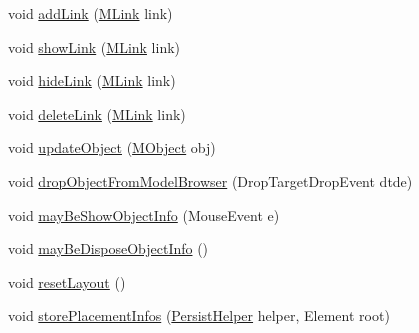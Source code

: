 \begin{DoxyCompactItemize}
\item 
void \hyperlink{classorg_1_1tzi_1_1use_1_1gui_1_1views_1_1diagrams_1_1objectdiagram_1_1_new_object_diagram_a4a1f7aac4cf125048456fac22bf7065e}{add\-Link} (\hyperlink{interfaceorg_1_1tzi_1_1use_1_1uml_1_1sys_1_1_m_link}{M\-Link} link)
\item 
void \hyperlink{classorg_1_1tzi_1_1use_1_1gui_1_1views_1_1diagrams_1_1objectdiagram_1_1_new_object_diagram_a06616425eae95e7cd7ff78eef36d0422}{show\-Link} (\hyperlink{interfaceorg_1_1tzi_1_1use_1_1uml_1_1sys_1_1_m_link}{M\-Link} link)
\item 
void \hyperlink{classorg_1_1tzi_1_1use_1_1gui_1_1views_1_1diagrams_1_1objectdiagram_1_1_new_object_diagram_a0f75792e0afb3957c0cb706755bfd6ff}{hide\-Link} (\hyperlink{interfaceorg_1_1tzi_1_1use_1_1uml_1_1sys_1_1_m_link}{M\-Link} link)
\item 
void \hyperlink{classorg_1_1tzi_1_1use_1_1gui_1_1views_1_1diagrams_1_1objectdiagram_1_1_new_object_diagram_a4e9d42caf1974571a03b594bfdfbd00b}{delete\-Link} (\hyperlink{interfaceorg_1_1tzi_1_1use_1_1uml_1_1sys_1_1_m_link}{M\-Link} link)
\item 
void \hyperlink{classorg_1_1tzi_1_1use_1_1gui_1_1views_1_1diagrams_1_1objectdiagram_1_1_new_object_diagram_ae520c718a17255740cabbe82fd36bcf5}{update\-Object} (\hyperlink{interfaceorg_1_1tzi_1_1use_1_1uml_1_1sys_1_1_m_object}{M\-Object} obj)
\item 
void \hyperlink{classorg_1_1tzi_1_1use_1_1gui_1_1views_1_1diagrams_1_1objectdiagram_1_1_new_object_diagram_a98e0de1520f074fbf323457aac45e2f0}{drop\-Object\-From\-Model\-Browser} (Drop\-Target\-Drop\-Event dtde)
\item 
void \hyperlink{classorg_1_1tzi_1_1use_1_1gui_1_1views_1_1diagrams_1_1objectdiagram_1_1_new_object_diagram_a741999ac1c6863ac05432485c20f0bd8}{may\-Be\-Show\-Object\-Info} (Mouse\-Event e)
\item 
void \hyperlink{classorg_1_1tzi_1_1use_1_1gui_1_1views_1_1diagrams_1_1objectdiagram_1_1_new_object_diagram_a7bddeaf7fe31f97fcbd85640d52ead3c}{may\-Be\-Dispose\-Object\-Info} ()
\item 
void \hyperlink{classorg_1_1tzi_1_1use_1_1gui_1_1views_1_1diagrams_1_1objectdiagram_1_1_new_object_diagram_a1817c2537f65e981b42796ba0a894fef}{reset\-Layout} ()
\item 
void \hyperlink{classorg_1_1tzi_1_1use_1_1gui_1_1views_1_1diagrams_1_1objectdiagram_1_1_new_object_diagram_addeaa78379aefb7b46d5dc899b07798b}{store\-Placement\-Infos} (\hyperlink{classorg_1_1tzi_1_1use_1_1gui_1_1util_1_1_persist_helper}{Persist\-Helper} helper, Element root)

\end{DoxyCompactItemize}
